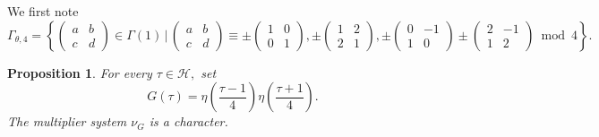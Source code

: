 \documentclass[12pt]{article}
\theoremstyle{definition}
\newtheorem{proposition}[theorem]{Proposition}
\numberwithin{equation}{section}
\numberwithin{theorem}{section}
\begin{document}
We first note 
\begin{equation*}
\Gamma_{\theta,4}
=
\left\{
\begin{pmatrix}
a & b \\
c & d
\end{pmatrix}
\in
\Gamma(1) \,\Big| \,
\begin{pmatrix}
a & b \\
c & d
\end{pmatrix}
\equiv 
\pm
\begin{pmatrix}
1 & 0 \\
0 & 1
\end{pmatrix}, 
\pm
\begin{pmatrix}
1 & 2 \\
2 & 1
\end{pmatrix}, 
\pm
\begin{pmatrix}
0 & -1 \\
1 & 0
\end{pmatrix} 
\pm
\begin{pmatrix}
2 & -1 \\
1 & 2
\end{pmatrix} 
\bmod{4}
\right\}.
\end{equation*}


\begin{proposition}
\label{prop:character-level4}
{\it
For every $\tau\in\mathscr{H},$
set 
\begin{equation*}
G(\tau)= \eta \left(\frac{\tau-1}{4} \right) \eta\left(\frac{\tau+1}{4} \right).
\end{equation*}
The multiplier system $\nu_{G}$ is a character. 
}
\end{proposition}
\end{document}
